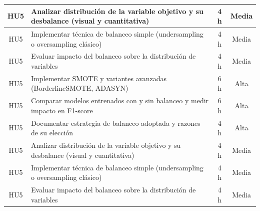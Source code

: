 \documentclass[
11pt, %
]{charter}
\begin{document}
\begin{table}[htpb]
\begin{tabularx}{\linewidth}{@{}|c|X|c|c|@{}}
HU5 & Analizar distribución de la variable objetivo y su desbalance (visual y cuantitativa) & 4 h & Media \\ \hline
HU5 & Implementar técnica de balanceo simple (undersampling o oversampling clásico) & 4 h & Media \\ \hline
HU5 & Evaluar impacto del balanceo sobre la distribución de variables & 4 h & Media \\ \hline
HU5 & Implementar SMOTE y variantes avanzadas (BorderlineSMOTE, ADASYN) & 6 h & Alta \\ \hline
HU5 & Comparar modelos entrenados con y sin balanceo y medir impacto en F1-score & 6 h & Alta \\ \hline
HU5 & Documentar estrategia de balanceo adoptada y razones de su elección & 4 h & Alta \\ \hline
HU5 & Analizar distribución de la variable objetivo y su desbalance (visual y cuantitativa) & 4 h & Media \\ \hline
HU5 & Implementar técnica de balanceo simple (undersampling o oversampling clásico) & 4 h & Media \\ \hline
HU5 & Evaluar impacto del balanceo sobre la distribución de variables & 4 h & Media \\ \hline

\end{tabularx}
\end{table}
\end{document}

